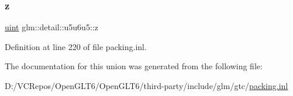 \mbox{\label{unionglm_1_1detail_1_1u5u6u5_ae0c24b8bea4457e78fe32f6e0cee6369}} 
\subsubsection{\texorpdfstring{z}{z}}
{\footnotesize\ttfamily \mbox{\hyperlink{group__core__precision_ga4fd29415871152bfb5abd588334147c8}{uint}} glm\+::detail\+::u5u6u5\+::z}



Definition at line 220 of file packing.\+inl.



The documentation for this union was generated from the following file\+:\begin{DoxyCompactItemize}
\item 
D\+:/\+V\+C\+Repos/\+Open\+G\+L\+T6/\+Open\+G\+L\+T6/third-\/party/include/glm/gtc/\mbox{\hyperlink{packing_8inl}{packing.\+inl}}\end{DoxyCompactItemize}
